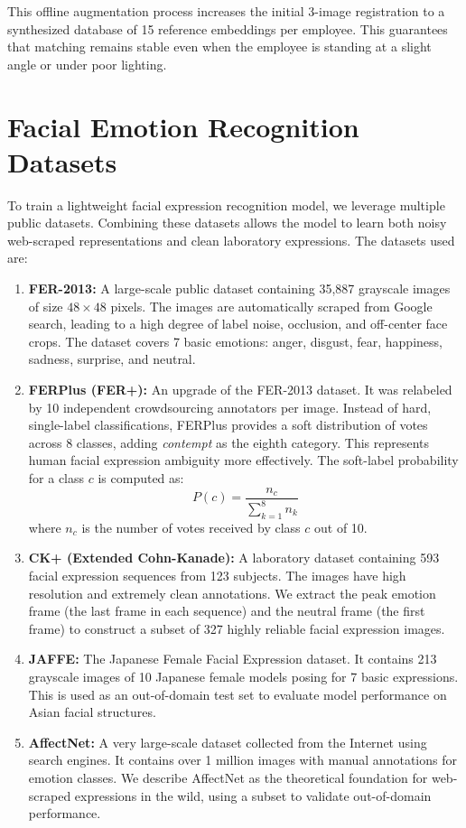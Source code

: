 This offline augmentation process increases the initial 3-image registration to a synthesized database of 15 reference embeddings per employee. This guarantees that matching remains stable even when the employee is standing at a slight angle or under poor lighting.

\section{Facial Emotion Recognition Datasets}
To train a lightweight facial expression recognition model, we leverage multiple public datasets. Combining these datasets allows the model to learn both noisy web-scraped representations and clean laboratory expressions. The datasets used are:
\begin{enumerate}
    \item \textbf{FER-2013:} A large-scale public dataset containing 35,887 grayscale images of size $48 \times 48$ pixels. The images are automatically scraped from Google search, leading to a high degree of label noise, occlusion, and off-center face crops. The dataset covers 7 basic emotions: anger, disgust, fear, happiness, sadness, surprise, and neutral.
    \item \textbf{FERPlus (FER+):} An upgrade of the FER-2013 dataset. It was relabeled by 10 independent crowdsourcing annotators per image. Instead of hard, single-label classifications, FERPlus provides a soft distribution of votes across 8 classes, adding \textit{contempt} as the eighth category. This represents human facial expression ambiguity more effectively. The soft-label probability for a class $c$ is computed as:
    \begin{equation}
        P(c) = \frac{n_c}{\sum_{k=1}^8 n_k}
    \end{equation}
    where $n_c$ is the number of votes received by class $c$ out of 10.
    \item \textbf{CK+ (Extended Cohn-Kanade):} A laboratory dataset containing 593 facial expression sequences from 123 subjects. The images have high resolution and extremely clean annotations. We extract the peak emotion frame (the last frame in each sequence) and the neutral frame (the first frame) to construct a subset of 327 highly reliable facial expression images.
    \item \textbf{JAFFE:} The Japanese Female Facial Expression dataset. It contains 213 grayscale images of 10 Japanese female models posing for 7 basic expressions. This is used as an out-of-domain test set to evaluate model performance on Asian facial structures.
    \item \textbf{AffectNet:} A very large-scale dataset collected from the Internet using search engines. It contains over 1 million images with manual annotations for emotion classes. We describe AffectNet as the theoretical foundation for web-scraped expressions in the wild, using a subset to validate out-of-domain performance.
\end{enumerate}

